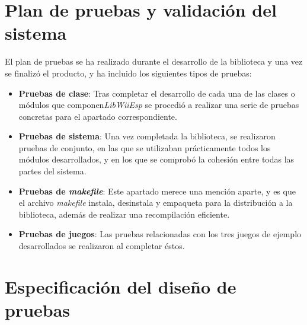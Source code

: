 



\section{Plan de pruebas y validación del sistema}

El plan de pruebas se ha realizado durante el desarrollo de la biblioteca y una vez se finalizó el producto, y ha incluido los siguientes tipos de pruebas:

\begin{itemize}
\item \textbf{Pruebas de clase}: Tras completar el desarrollo de cada una de las clases o módulos que componen\emph{LibWiiEsp} se procedió a realizar una serie de pruebas concretas para el apartado correspondiente.
\item \textbf{Pruebas de sistema}: Una vez completada la biblioteca, se realizaron pruebas de conjunto, en las que se utilizaban prácticamente todos los módulos desarrollados, y en los que se comprobó la cohesión entre todas las partes del sistema.
\item \textbf{Pruebas de \emph{makefile}}: Este apartado merece una mención aparte, y es que el archivo \emph{makefile} instala, desinstala y empaqueta para la distribución a la biblioteca, además de realizar una recompilación eficiente.
\item \textbf{Pruebas de juegos}: Las pruebas relacionadas con los tres juegos de ejemplo desarrollados se realizaron al completar éstos.
\end{itemize}

\section{Especificación del diseño de pruebas}

